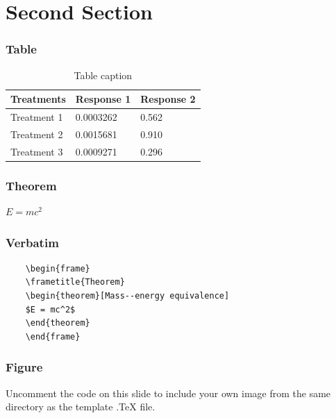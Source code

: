 \documentclass[9pt]{beamer}
\begin{document}
	\section{Second Section}

	\begin{frame}
	\frametitle{Table}
	\begin{table}
	\begin{tabular}{l l l}
	\toprule
	\textbf{Treatments} & \textbf{Response 1} & \textbf{Response 2}\\
	\midrule
	Treatment 1 & 0.0003262 & 0.562 \\
	Treatment 2 & 0.0015681 & 0.910 \\
	Treatment 3 & 0.0009271 & 0.296 \\
	\bottomrule
	\end{tabular}
	\caption{Table caption}
	\end{table}
	\end{frame}


	\begin{frame}
	\frametitle{Theorem}
	\begin{theorem}
	$E = mc^2$
	\end{theorem}
	\end{frame}


	\begin{frame}[fragile] %
	\frametitle{Verbatim}
	\begin{example}
	\begin{verbatim}
	\begin{frame}
	\frametitle{Theorem}
	\begin{theorem}[Mass--energy equivalence]
	$E = mc^2$
	\end{theorem}
	\end{frame}\end{verbatim}
	\end{example}
	\end{frame}


	\begin{frame}
	\frametitle{Figure}
	Uncomment the code on this slide to include your own image from the same directory as the template .TeX file.
	\end{frame}
\end{document}
